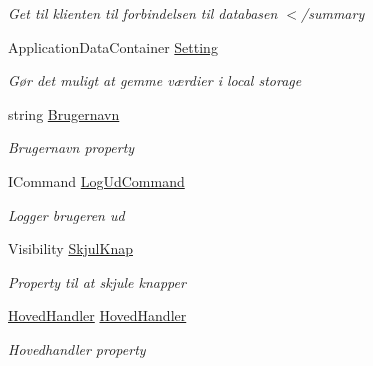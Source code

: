 \begin{DoxyCompactItemize}
\begin{DoxyCompactList}\small\item\em Get til klienten til forbindelsen til databasen $<$/summary \end{DoxyCompactList}\item 
Application\+Data\+Container \hyperlink{class__1aarsproeve_1_1_view_model_1_1_hoved_view_model_afbb2eb2f33bdb6defe9979b80c6e79ff}{Setting}
\begin{DoxyCompactList}\small\item\em Gør det muligt at gemme værdier i local storage \end{DoxyCompactList}\item 
string \hyperlink{class__1aarsproeve_1_1_view_model_1_1_hoved_view_model_a48f0c876a1e3cd598fe3c4c7c65a760d}{Brugernavn}
\begin{DoxyCompactList}\small\item\em Brugernavn property \end{DoxyCompactList}\item 
I\+Command \hyperlink{class__1aarsproeve_1_1_view_model_1_1_hoved_view_model_ae541527e8e9063cc3337b229b93c7e48}{Log\+Ud\+Command}
\begin{DoxyCompactList}\small\item\em Logger brugeren ud \end{DoxyCompactList}\item 
Visibility \hyperlink{class__1aarsproeve_1_1_view_model_1_1_hoved_view_model_ab292f28c3e469ad73d6d6e648f3096f0}{Skjul\+Knap}
\begin{DoxyCompactList}\small\item\em Property til at skjule knapper \end{DoxyCompactList}\item 
\hyperlink{class__1aarsproeve_1_1_handler_1_1_hoved_handler}{Hoved\+Handler} \hyperlink{class__1aarsproeve_1_1_view_model_1_1_hoved_view_model_aaeba819c1330608f58f968d670367c47}{Hoved\+Handler}
\begin{DoxyCompactList}\small\item\em Hovedhandler property \end{DoxyCompactList}\item 

\end{DoxyCompactItemize}

